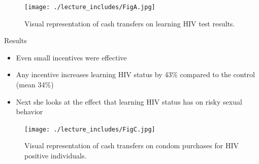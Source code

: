 \documentclass{beamer}
\begin{document}
\begin{frame}[plain]

  \begin{figure}[htb]\centering
    \texttt{[image: ./lecture\_includes/FigA.jpg]}
    \caption{Visual representation of cash transfers on learning HIV test results.}
    \label{fig:thorntonfig}
  \end{figure}

\end{frame}


\begin{frame}{Results}

  \begin{itemize}
    \item Even small incentives were effective
    \item Any incentive increases learning HIV status by 43\% compared to the control (mean 34\%)
    \item Next she looks at the effect that learning HIV status has on risky sexual behavior
  \end{itemize}

\end{frame}

\begin{frame}[plain]

  \begin{figure}[htb]\centering
    \texttt{[image: ./lecture\_includes/FigC.jpg]}
    \caption{Visual representation of cash transfers on condom purchases for HIV positive individuals.}
    \label{fig:thorntoncondomfig}
  \end{figure}

\end{frame}
\end{document}
